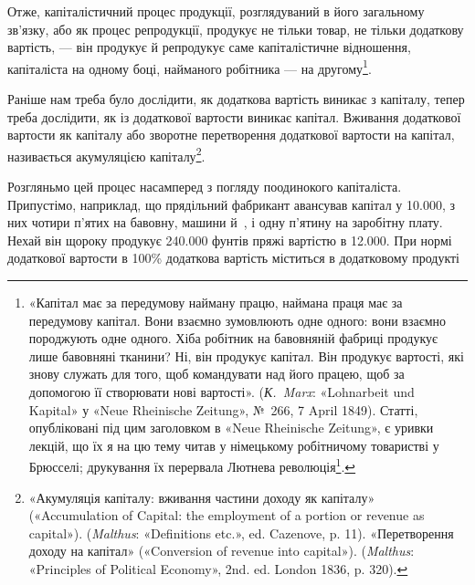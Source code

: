 \enlargethispage{\baselineskip}
Отже, капіталістичний процес продукції, розглядуваний в
його загальному зв’язку, або як процес репродукції, продукує
не тільки товар, не тільки додаткову вартість, — він продукує
й репродукує саме капіталістичне відношення, капіталіста на
одному боці, найманого робітника — на другому\footnote{
«Капітал має за передумову найману працю, наймана праця має за передумову
капітал. Вони взаємно зумовлюють одне одного: вони взаємно породжують одне
одного. Хіба робітник на бавовняній фабриці
продукує лише бавовняні тканини? Ні, він продукує капітал. Він продукує
вартості, які знову служать для того, щоб командувати над його працею, щоб за
допомогою її створювати нові вартості». (\emph{К.~Marx}:
«Lohnarbeit und Kapital» у «Neue Rheinische Zeitung», №~266, 7 April 1849).
Статті, опубліковані під цим заголовком в «Neue Rheinische Zeitung», є уривки
лекцій, що їх я на цю тему читав у німецькому
робітничому товаристві у Брюсселі; друкування їх перервала Лютнева
революція\footnote*{
Статті ці з’явилися потім окремою брошурою і під тією ж назвою.
Є українське видання: Партвидав «Пролетар» 1932~ \emph{Ред.}
}.
}.

\vspace{\bigskipamount}

Раніше нам треба було дослідити, як додаткова вартість виникає
з капіталу, тепер треба дослідити, як із додаткової вартости
виникає капітал. Вживання додаткової вартости як капіталу
або зворотне перетворення додаткової вартости на капітал, називається
акумуляцією капіталу\footnote{
«Акумуляція капіталу: вживання частини доходу як капіталу» («Accumulation of
Capital: the employment of a portion or revenue as capital»). (\emph{Malthus}:
«Definitions etc.», ed. Cazenove, p. 11).
«Перетворення доходу на капітал» («Conversion of revenue into capital»).
(\emph{Malthus}: «Principles of Political Economy», 2nd. ed. London 1836, p. 320).
}.

Розгляньмо цей процес насамперед з погляду поодинокого капіталіста. Припустімо,
наприклад, що прядільний фабрикант авансував капітал у \num{10.000},
з них чотири п’ятих на бавовну, машини й~, і одну п’ятину на заробітну
плату. Нехай він щороку продукує \num{240.000} фунтів пряжі
вартістю в \num{12.000}. При нормі додаткової вартости в 100\%
додаткова вартість міститься в додатковому продукті
\parbreak{}  %
